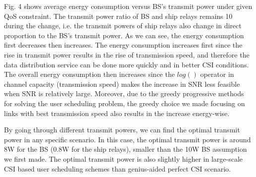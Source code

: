 \documentclass[conference]{IEEEtran}
\begin{document}
 Fig. 4 shows average energy consumption versus BS's transmit power under given QoS constraint. The transmit power ratio of BS and ship relays remains 10 during the change, i.e. the transmit powers of ship relays also change in direct proportion to the BS's transmit power. 
 As we can see, the energy consumption first decreases then increases. 
 The energy consumption increases first since the rise in transmit power results in the rise of transmission speed, and therefore the data distribution service can be done more quickly and in better CSI conditions. 
 The overall energy consumption then increases since the $log\left({}\right)$ operator in channel capacity (transmission speed) makes the increase in SNR less feasible when SNR is relatively large. Moreover, due to the greedy progressive methods for solving the user scheduling problem, the greedy choice we made focusing on links with best transmission speed also results in the increase energy-wise. 
 
 By going through different transmit powers, we can find the optimal transmit power in any specific scenario. In this case, the optimal transmit power is around 8W for the BS (0.8W for the ship relays), smaller than the 10W BS assumption we first made. The optimal transmit power is also slightly higher in large-scale CSI based user scheduling schemes than genius-aided perfect CSI scenario. 
 
 
 
\end{document}

